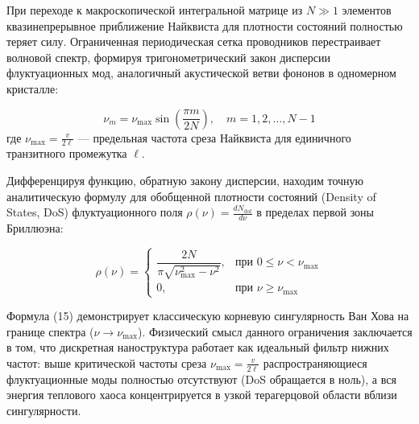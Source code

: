 \documentclass[12pt,a4paper]{article}
\begin{document}
При переходе к макроскопической интегральной матрице из $N \gg 1$ элементов квазинепрерывное приближение Найквиста для плотности состояний полностью теряет силу. Ограниченная периодическая сетка проводников перестраивает волновой спектр, формируя тригонометрический закон дисперсии флуктуационных мод, аналогичный акустической ветви фононов в одномерном кристалле:

\begin{equation}
\nu_m = \nu_{\text{max}} \sin\left( \frac{\pi m}{2N} \right), \quad m = 1, 2, \dots, N-1
\end{equation}
где $\nu_{\text{max}} = \frac{v}{2\ell}$ — предельная частота среза Найквиста для единичного транзитного промежутка $\ell$.

Дифференцируя функцию, обратную закону дисперсии, находим точную аналитическую формулу для обобщенной плотности состояний (Density of States, DoS) флуктуационного поля $\rho(\nu) = \frac{dN_{\text{dof}}}{d\nu}$ в пределах первой зоны Бриллюэна:

\begin{equation}
\rho(\nu) =
\begin{cases}
\dfrac{2N}{\pi \sqrt{\nu_{\text{max}}^2 - \nu^2}}, & \text{при } 0 \le \nu < \nu_{\text{max}} \\
0, & \text{при } \nu \ge \nu_{\text{max}}
\end{cases}
\end{equation}

Формула (15) демонстрирует классическую корневую сингулярность Ван Хова на границе спектра ($\nu \to \nu_{\text{max}}$). Физический смысл данного ограничения заключается в том, что дискретная наноструктура работает как идеальный фильтр нижних частот: выше критической частоты среза $\nu_{\text{max}} = \frac{v}{2\ell}$ распространяющиеся флуктуационные моды полностью отсутствуют (DoS обращается в ноль), а вся энергия теплового хаоса концентрируется в узкой терагерцовой области вблизи сингулярности.
\end{document}
